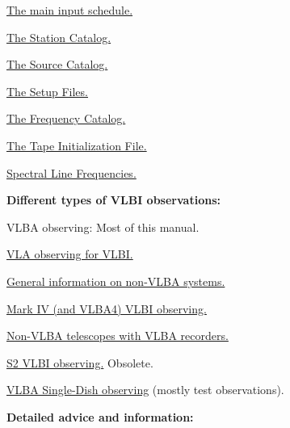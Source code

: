 \documentclass{report}
\begin{document}
\begin{list}{}{\parsep 0em  \itemsep 0em }
\item 
{\hyperref[SEC:SCHPAR]{The main input schedule.}}

\item 
{\hyperref[SEC:STACAT]{The Station Catalog.}}

\item 
{\hyperref[SEC:SRCCAT]{The Source Catalog.}}

\item 
{\hyperref[SEC:SETUPS]{The Setup Files.}}

\item 
{\hyperref[SEC:FRQCAT]{The Frequency Catalog.}}

\item 
{\hyperref[SEC:TPINI]{The Tape Initialization File.}}

\item 
{\hyperref[SEC:LINE]{Spectral Line Frequencies.}}

\end{list}


{\bf Different types of VLBI observations:}

\begin{list}{}{\parsep 0em  \itemsep 0em }

\item VLBA observing:  Most of this manual.

\item 
{\hyperref[SEC:VLA]{VLA observing for VLBI.}}

\item 
{\hyperref[SEC:RECSYS]{General information on non-VLBA systems.}}

\item 
{\hyperref[SSEC:MKIV]{Mark IV (and VLBA4) VLBI observing.}}

\item 
{\hyperref[SSEC:FS9VLBA]{Non-VLBA telescopes with VLBA recorders.}}

\item 
{\hyperref[SSEC:S2]{S2 VLBI observing.}}  Obsolete.

\item 
{\hyperref[SEC:SPECIALVLBA]{VLBA Single-Dish observing}} (mostly
test observations).

\end{list}


{\bf Detailed advice and information:}
\end{document}
